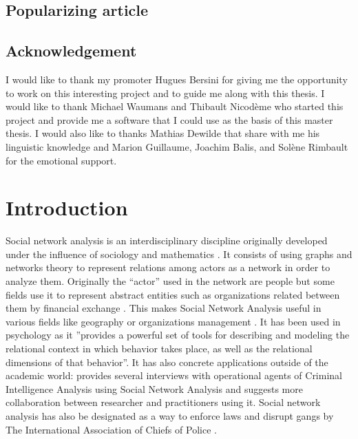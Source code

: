 \documentclass[a4paper, 12pt]{report}
\begin{document}
\section*{Popularizing article}

\section*{Acknowledgement}
I would like to thank my promoter Hugues Bersini for giving me the opportunity to work on this interesting project and to guide me along with this thesis. I would like to thank Michael Waumans and Thibault Nicodème who started this project and provide me a software that I could use as the basis of this master thesis. I would also like to thanks Mathias Dewilde that share with me his linguistic knowledge and Marion Guillaume, Joachim Balis, and Solène Rimbault for the emotional support.
\tableofcontents

\chapter{Introduction}
Social network analysis is an interdisciplinary discipline originally developed under the influence of sociology and mathematics \citep{history_social}. It consists of using graphs and networks theory to represent relations among actors as a network in order to analyze them. Originally the ``actor'' used in the network are people but some fields use it to represent abstract entities such as organizations related between them by financial exchange \citep{general_sna}. This makes Social Network Analysis useful in various fields like geography \citep{economic_geography} or organizations management \citep{management}. It has been used in psychology \citep{psy} as it ''provides a powerful set of tools for describing and modeling the relational context in which behavior takes place, as well as the relational dimensions of that behavior''\citep{intro}. It has also concrete applications outside of the academic world: \cite{criminal} provides several interviews with operational agents of Criminal Intelligence Analysis using Social Network Analysis and suggests more collaboration between researcher and practitioners using it. Social network analysis has also be designated as a way to enforce laws and disrupt gangs by The International Association of Chiefs of Police \citep{police}. \\
\end{document}
